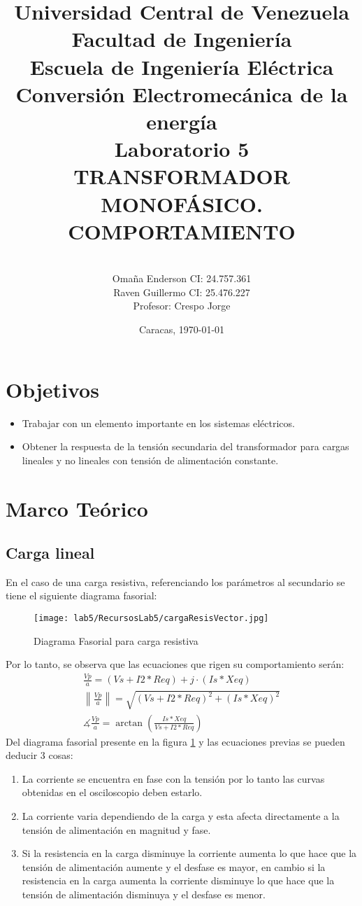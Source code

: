 \documentclass[11pt,letterpaper]{article}     %
\author{\\Omaña Enderson CI:  24.757.361 \\Raven Guillermo CI: 25.476.227\\Profesor: Crespo Jorge \vspace*{1in}}
\title{Universidad Central de Venezuela\\{ Facultad de Ingeniería\\Escuela de Ingeniería Eléctrica\\ Conversión Electromecánica de la energía\\\vspace*{1.5in} }Laboratorio 5\\TRANSFORMADOR MONOFÁSICO. COMPORTAMIENTO\vspace*{1.35in}}
\date{Caracas, \today}
\begin{document}
\maketitle							%
\newpage
\tableofcontents
\newpage
\section{Objetivos}
\begin{itemize}
	\item Trabajar con un elemento importante en los sistemas eléctricos.
	\item Obtener la respuesta de la tensión secundaria del transformador para cargas lineales y no lineales con
	tensión de alimentación constante.
\end{itemize}
\section{Marco Teórico}
\subsection{Carga lineal}
En el caso de una carga resistiva, referenciando los parámetros al secundario se tiene el siguiente diagrama fasorial:
\begin{figure}[H]
	\centering
	\texttt{[image: lab5/RecursosLab5/cargaResisVector.jpg]}
	\caption{Diagrama Fasorial para carga resistiva}
	\label{fig:cargaresisvector}
\end{figure}
Por lo tanto, se observa que las ecuaciones que rigen su comportamiento serán:
\begin{align}
	\frac{Vp}{a}= (Vs+I2*Req) +j\cdot(Is*Xeq)\\
	\left\|\frac{Vp}{a}\right\| = \sqrt{(Vs+I2*Req)^{2}+(Is*Xeq)^{2}}\\
	\measuredangle \frac{Vp}{a} = \arctan\left(\frac{Is*Xeq}{Vs+I2*Req}\right)
\end{align}
Del diagrama fasorial presente en la figura \ref{fig:cargaresisvector} y las ecuaciones previas se pueden deducir 3 cosas: 
\begin{enumerate}
	\item La corriente se encuentra en fase con la tensión por lo tanto las curvas obtenidas en el osciloscopio deben estarlo.
	\item La corriente varia dependiendo de la carga y esta afecta directamente a la tensión de alimentación en magnitud y fase.
	\item Si la resistencia en la carga disminuye la corriente aumenta lo que hace que la tensión de alimentación aumente y el desfase es mayor, en cambio si la resistencia en la carga aumenta la corriente disminuye lo que hace que la tensión de alimentación disminuya y el desfase es menor.
\end{enumerate}
\end{document}
